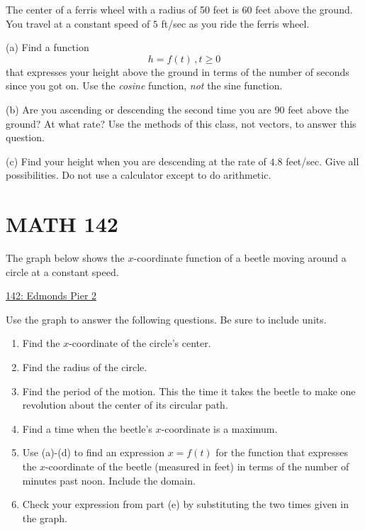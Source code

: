 \documentclass{ximera}
\begin{document}
\begin{question} \label{Q:324gg434}
The center of a ferris wheel with a radius of 50 feet is 60 feet above the ground. You travel at a constant speed of $5$ ft/sec as you ride the ferris wheel.

(a)  Find a function 
\[
 h = f(t) \, , t\geq 0
\] 
that expresses your height above the ground in terms of the number of seconds since you got on. Use the \emph{cosine} function, \emph{not} the sine function.

(b) Are you ascending or descending the second time you are 90 feet above the ground? At what rate? Use the methods of this class, not vectors, to answer this question.

(c) Find your height when you are descending at the rate of $4.8$ feet/sec. Give all possibilities. Do not use a calculator except to do arithmetic.

\end{question}


\section{MATH 142}

\begin{question}  \label{QDDFDF}

The graph below shows the $x$-coordinate function of a beetle moving around a circle at a constant speed.

\begin{onlineOnly}
    \begin{center}
\end{center}
\end{onlineOnly}

\href{https://www.desmos.com/calculator/qi6c9xbhnw}{142: Edmonds Pier 2}

Use the graph to answer the following questions. Be sure to include units.
\begin{enumerate}

\item Find the $x$-coordinate of the circle's center.

\item Find the radius of the circle.

\item Find the period of the motion. This the time it takes the beetle to make one revolution about the center of its circular path.

\item Find a time when the beetle's $x$-coordinate is a maximum.

\item Use (a)-(d) to find an expression $x=f(t)$ for the function that expresses the $x$-coordinate of the beetle (measured in feet) in terms of the number of minutes past noon. Include the domain.

\item Check your expression from part (e) by substituting the two times given in the graph.


\end{enumerate}


\end{question}
\end{document}
